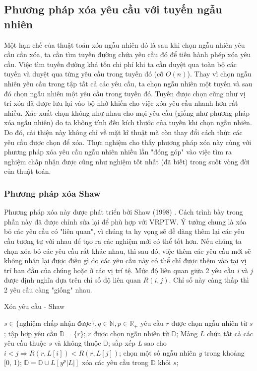 \subsection*{Phương pháp xóa yêu cầu với tuyến ngẫu nhiên}
Một hạn chế của thuật toán xóa ngẫu nhiên đó là sau khi chọn ngẫu nhiên yêu cầu cần xóa, ta cần tìm tuyến đường chứa yêu cầu đó để tiến hành phép xóa yêu cầu. Việc tìm tuyến đường khá tốn chi phí khi ta cần duyệt qua toàn bộ các tuyến và duyệt qua từng yêu cầu trong tuyến đó (cỡ $O(n)$). Thay vì chọn ngẫu nhiên yêu cầu trong tập tất cả các yêu cầu, ta chọn ngẫu nhiên một tuyến và sau đó chọn ngẫu nhiên một yêu cầu trong tuyến đó. Tuyến được chọn cũng như vị trí xóa đã được lưu lại vào bộ nhớ khiến cho việc xóa yêu cầu nhanh hơn rất nhiều. Xác xuất chọn không như nhau cho mọi yêu cầu (giống như phương pháp xóa ngẫu nhiên) do ta không tính đến kích thước của tuyến khi chọn ngẫu nhiên. Do đó, cải thiện này không chỉ về mặt kĩ thuật mà còn thay đổi cách thức các yêu cầu được chọn để xóa. Thực nghiệm cho thấy phương pháp xóa này cùng với phương pháp xóa yêu cầu ngẫu nhiên nhiều lần "đóng góp" vào việc tìm ra nghiệm chấp nhận được cũng như nghiệm tốt nhất (đã biết) trong suốt vòng đời của thuật toán.

\subsubsection*{Phương pháp xóa Shaw}
Phương pháp xóa này được phát triển bởi Shaw (1998) \cite{shaw1998using}. Cách trình bày trong phần này đã được chỉnh sửa lại để phù hợp với VRPTW. Ý tưởng chung là xóa bỏ các yêu cầu có "liên quan", vì chúng ta hy vọng sẽ dễ dàng thêm lại các yêu cầu tương tự với nhau để tạo ra các nghiệm mới có thể tốt hơn. Nếu chúng ta chọn xóa bỏ các yêu cầu rất khác nhau, thì sau đó, việc thêm các yêu cầu mới sẽ không nhận lại được điều gì do các yêu cầu này có thể chỉ được thêm vào tại vị trí ban đầu của chúng hoặc ở các vị trí tệ. Mức độ liên quan giữa 2 yêu cầu \textit{i} và \textit{j} được định nghĩa dựa trên chỉ số độ liên quan $R(i,j)$. Chỉ số này càng thấp thì 2 yêu cầu càng "giống" nhau.

\begin{algorithm}
	\caption{Xóa yêu cầu - Shaw}
	\begin{algorithmic}[1]
		\Require $s \in \text{\{nghiệm chấp nhận được\}}, q \in \mathbb{N}, p \in \mathbb{R}_{+}$
		\State yêu cầu $r$ được chọn ngẫu nhiên từ $s$;
		\State tập hợp yêu cầu $\mathbb{D}=\{r\}$;
		\State $r$ được chọn ngẫu nhiên từ $\mathbb{D}$;
		\State Mảng $L$ chứa tất cả các yêu cầu thuộc $s$ và không thuộc $\mathbb{D}$;
		\State sắp xếp \textit{L} sao cho $i<j \Rightarrow R(r, L\left[ i \right]) < R(r, L\left[ j \right])$;
		\State chọn một số ngẫu nhiên \textit{y} trong khoảng [0, 1);
		\State $\mathbb{D}=\mathbb{D}\cup {L \left[ y^p|L| \right]}$
		\EndWhile
		\State xóa các yêu cầu trong $\mathbb{D}$ khỏi $s$;
	\end{algorithmic}
\end{algorithm}

